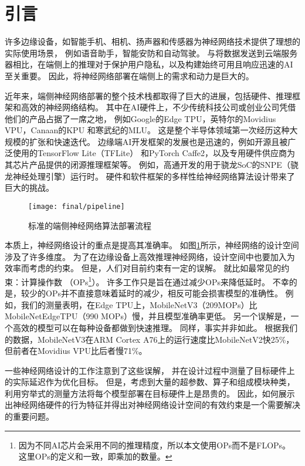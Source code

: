 \cleardoublepage

\section{引言}
许多边缘设备，如智能手机、相机、扬声器和传感器为神经网络技术提供了理想的实际使用场景，
例如语音助手，智能安防和自动驾驶。
与将数据发送到云端服务器相比，在端侧上的推理对于保护用户隐私，以及构建始终可用且响应迅速的AI至关重要。
因此，将神经网络部署在端侧上的需求和动力是巨大的。

近年来，端侧神经网络部署的整个技术栈都取得了巨大的进展，包括硬件、推理框架和高效的神经网络结构。
其中在AI硬件上，不少传统科技公司或创业公司凭借他们的产品占据了一席之地，
例如Google的Edge TPU\cite{edgetpu}，英特尔的Movidius VPU\cite{myriad}，Canaan的KPU\cite{k210}
和寒武纪的MLU\cite{cambricon}。
这是整个半导体领域第一次经历这种大规模的扩张和快速迭代。
边缘端AI开发框架的发展也是迅速的，例如开源且被广泛使用的TensorFlow Lite（TFLite）\cite{tflite}
和PyTorch Caffe2\cite{caffe2}，以及专用硬件供应商为其芯片产品提供的闭源推理框架等。
例如，高通开发的用于骁龙SoC的SNPE（骁龙神经处理引擎）运行时\cite{snpe}。
硬件和软件框架的多样性给神经网络算法设计带来了巨大的挑战。

\begin{figure}[htbp]
    \centering
    \texttt{[image: final/pipeline]}
    \caption{\label{fig:pipeline}标准的端侧神经网络算法部署流程}
\end{figure}

本质上，神经网络设计的重点是提高其准确率。
如图\ref{fig:pipeline}所示，神经网络的设计空间涉及了许多维度。
为了在边缘设备上高效推理神经网络，设计空间中也要加入为效率而考虑的约束。
但是，人们对目前约束有一定的误解。
就比如最常见的约束：计算操作数
（OPs\footnote{因为不同AI芯片会采用不同的推理精度，所以本文使用OPs而不是FLOPs。
这里OPs的定义和\cite{zhang2018shufflenet}一致，即乘加的数量。}）。
许多工作只是旨在通过减少OPs来降低延时。
不幸的是，较少的OPs并不直接意味着延时的减少，相反可能会损害模型的准确性。
例如，我们的测量表明，在Edge TPU上，MobileNetV3（209MOPs）比MobileNetEdgeTPU（990 MOPs）慢，并且模型准确率更低。
另一个误解是，一个高效的模型可以在每种设备都做到快速推理。
同样，事实并非如此。
根据我们的数据，MobileNetV3在ARM Cortex A76上的运行速度比MobileNetV2快25\%，
但前者在Movidius VPU比后者慢71\%。

一些神经网络设计的工作\cite{dai2019chamnet, tan2019mnasnet, yang2018netadapt}注意到了这些误解，
并在设计过程中测量了目标硬件上的实际延迟作为优化目标。
但是，考虑到大量的超参数、算子和组成模块种类，利用穷举式的测量方法将每个模型部署在目标硬件上是昂贵的。
因此，如何展示出神经网络硬件的行为特征并得出对神经网络设计空间的有效约束是一个需要解决的重要问题。

